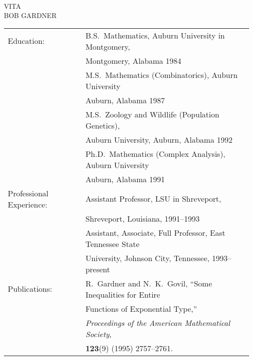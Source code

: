 \documentclass[12pt]{etsu_thesis}
\begin{document}
\ \ \ \ \

\thispagestyle{plain}

\vspace{-.4in}

\begin{center}
VITA\\ BOB GARDNER
\end{center}

\vspace{.4in}

\noindent
\begin{tabular}{ll}
Education:               & B.S.\ Mathematics, Auburn University in Montgomery,\\
\rule[0in]{0in}{.2in}    & \hspace{.25in} Montgomery, Alabama 1984\\
\rule[0in]{0in}{.2in}    & M.S.\ Mathematics (Combinatorics), Auburn University\\
\rule[0in]{0in}{.2in}    & \hspace{.25in} Auburn, Alabama 1987\\
\rule[0in]{0in}{.2in}    & M.S.\ Zoology and Wildlife (Population Genetics), \\
\rule[0in]{0in}{.2in}    & \hspace{.25in} Auburn University, Auburn, Alabama 1992\\
\rule[0in]{0in}{.2in}    & Ph.D.\ Mathematics (Complex Analysis), Auburn University\\
\rule[0in]{0in}{.2in}    & \hspace{.25in} Auburn, Alabama 1991\\

\rule[0in]{0in}{.4in}
Professional Experience: \hspace{.1in} & Assistant Professor, LSU in Shreveport,\\
\rule[0in]{0in}{.2in}    & \hspace{.25in} Shreveport, Louisiana, 1991--1993\\
\rule[0in]{0in}{.2in}    & Assistant, Associate, Full Professor, East Tennessee State \\
\rule[0in]{0in}{.2in}    & \hspace{.25in} University, Johnson City, Tennessee, 1993--present\\

\rule[0in]{0in}{.4in}
Publications:            & R.\ Gardner and N.\ K.\ Govil, ``Some Inequalities for Entire\\
\rule[0in]{0in}{.2in}    & \hspace{.25in}  Functions of Exponential Type,'' \\
\rule[0in]{0in}{.2in}    & \hspace{.25in} {\it Proceedings of the American Mathematical Society},\\
\rule[0in]{0in}{.2in}    & \hspace{.25in} {\bf 123}(9) (1995) 2757--2761.

\end{tabular}
\end{document}
